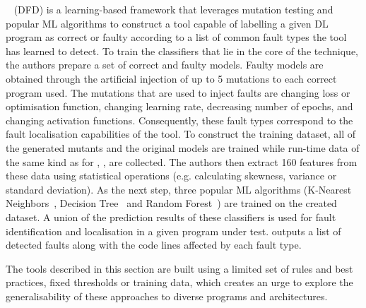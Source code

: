\dfd~\cite{deepfd} (DFD) is a learning-based framework that leverages mutation testing and popular ML algorithms to construct a tool capable of labelling a given DL program as correct or faulty according to a list of common fault types the tool has learned to detect. To train the classifiers that lie in the core of the technique, the authors prepare a set of correct and faulty models. Faulty models are obtained through the artificial injection of up to 5 mutations to each correct program used. The mutations that are used to inject faults are changing loss or optimisation function, changing learning rate, decreasing number of epochs, and changing activation functions. Consequently, these fault types correspond to the fault localisation capabilities of the tool. To construct the training dataset, all of the generated mutants and the original models are trained while run-time data of the same kind as for \DL, \DD, \UM are collected. The authors then extract 160 features from these data using statistical operations (e.g. calculating skewness, variance or standard deviation). As the next step, three popular ML algorithms (K-Nearest Neighbors~\cite{knearestn}, Decision Tree~\cite{breiman2017classification} and Random Forest~\cite{ho1995random}) are trained on the created dataset.  A union of the prediction results of these classifiers is used for fault identification and localisation in a given program under test. \dfd outputs a list of detected faults along with the code lines affected by each fault type.

The tools described in this section are built using a limited set of rules and best practices, fixed thresholds or training data, which creates an urge to explore the generalisability of these approaches to diverse programs and architectures.